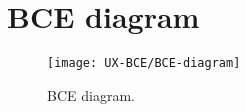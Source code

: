 \section{BCE diagram}

\begin{figure}[H]
	\centering
	\texttt{[image: UX-BCE/BCE-diagram]}
	\caption[BCE Diagram]{BCE diagram.}
	\label{fig:BCE-diagram}
\end{figure}